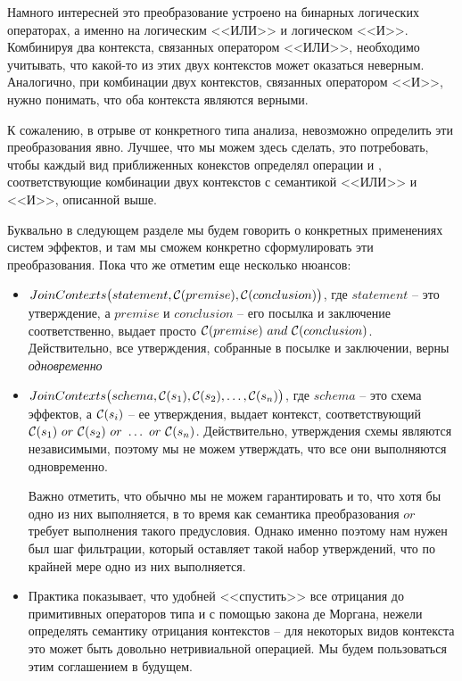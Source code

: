 Намного интересней это преобразование устроено на бинарных логических операторах, а именно на логическим <<ИЛИ>> и логическом <<И>>. Комбинируя два контекста, связанных оператором <<ИЛИ>>, необходимо учитывать, что какой-то из этих двух контекстов может оказаться неверным. Аналогично, при комбинации двух контекстов, связанных оператором <<И>>, нужно понимать, что оба контекста являются верными.

К сожалению, в отрыве от конкретного типа анализа, невозможно определить эти преобразования явно. Лучшее, что мы можем здесь сделать, это потребовать, чтобы каждый вид приближенных конекстов определял операции  и , соответствующие комбинации двух контекстов с семантикой <<ИЛИ>> и <<И>>, описанной выше.

Буквально в следующем разделе мы будем говорить о конкретных применениях систем эффектов, и там мы сможем конкретно сформулировать эти преобразования. Пока что же отметим еще несколько нюансов:

\begin{itemize}
  \item $JoinContexts \big( statement, \mathcal{C}(premise), \mathcal{C}(conclusion) \big)$, где $statement$ -- это утверждение, а $premise$ и $conclusion$ -- его посылка и заключение соответственно, выдает просто $\mathcal{C}(premise)\ and\ \mathcal{C}(conclusion)$. Действительно, все утверждения, собранные в посылке и заключении, верны \emph{одновременно}

  \item $JoinContexts \big(schema, \mathcal{C}(s_1), \mathcal{C}(s_2), \ldots, \mathcal{C}(s_n) \big)$, где $schema$ -- это схема эффектов, а $\mathcal{C}(s_i)$ -- ее утверждения, выдает контекст, соответствующий $\ctx(s_1)\ or\ \ctx(s_2)\ or\ \ldots\ or\ \ctx(s_n)$. Действительно, утверждения схемы являются независимыми, поэтому мы не можем утверждать, что все они выполняются одновременно. 
  
  Важно отметить, что обычно мы не можем гарантировать и то, что хотя бы одно из них выполняется, в то время как семантика преобразования $or$ требует выполнения такого предусловия. Однако именно поэтому нам нужен был шаг фильтрации, который оставляет такой набор утверждений, что по крайней мере одно из них выполняется.

  \item Практика показывает, что удобней <<спустить>> все отрицания до примитивных операторов типа  и \code{!=} с помощью закона де Моргана, нежели определять семантику отрицания контекстов -- для некоторых видов контекста это может быть довольно нетривиальной операцией. Мы будем пользоваться этим соглашением в будущем.
\end{itemize}




